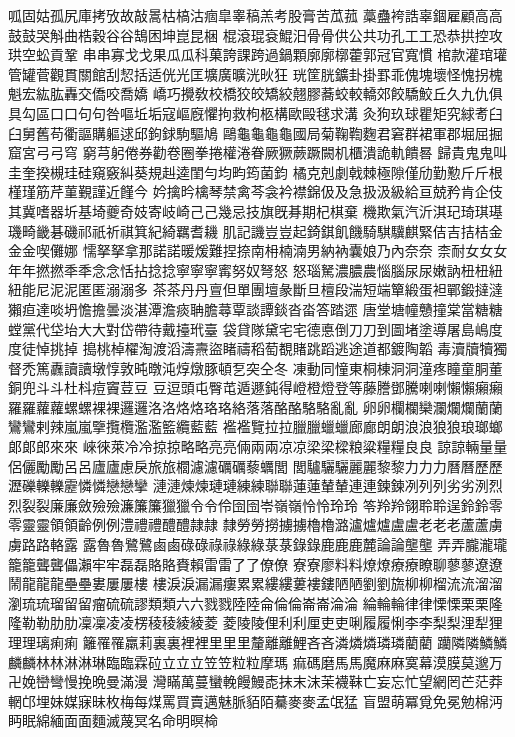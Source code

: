 呱固姑孤尻庫拷攷故敲暠枯槁沽痼皐睾稿羔考股膏苦苽菰
藁蠱袴誥辜錮雇顧⾼高⿎鼓哭斛曲梏穀⾕谷鵠困坤崑昆梱
棍滾琨袞鯤汨⾻骨供公共功孔⼯工恐恭拱控攻珙空蚣貢鞏
串串寡⼽戈果⽠瓜科菓誇課跨過鍋顆廓廓槨藿郭冠官寬慣
棺款灌琯瓘管罐菅觀貫關館刮恝括适侊光匡壙廣曠洸炚狂
珖筐胱鑛卦掛罫乖傀塊壞怪愧拐槐魁宏紘肱轟交僑咬喬嬌
嶠巧攪敎校橋狡皎矯絞翹膠蕎蛟較轎郊餃驕鮫丘久九仇俱
具勾區⼝口句句咎嘔坵垢寇嶇廐懼拘救枸柩構歐毆毬求溝
灸狗玖球瞿矩究絿耉⾅臼舅舊苟衢謳購軀逑邱鉤銶駒驅鳩
鷗⿔龜龜龜國局菊鞠鞫麴君窘群裙軍郡堀屈掘窟宮⼸弓穹
窮芎躬倦券勸卷圈拳捲權淃眷厥獗蕨蹶闕机櫃潰詭軌饋晷
歸貴⿁鬼叫圭奎揆槻珪硅窺竅糾葵規赳逵閨勻均畇筠菌鈞
橘克剋劇戟棘極隙僅劤勤懃⽄斤根槿瑾筋芹菫覲謹近饉今
妗擒昑檎琴禁禽芩衾衿襟錦伋及急扱汲級給亘兢矜肯企伎
其冀嗜器圻基埼夔奇妓寄岐崎⼰己幾忌技旗旣朞期杞棋棄
機欺氣汽沂淇玘琦琪璂璣畸畿碁磯祁祇祈祺箕紀綺羈耆耭
肌記譏豈豈起錡錤飢饑騎騏驥麒緊佶吉拮桔⾦金金喫儺娜
懦拏拏拿那諾諾暖煖難捏捺南枏楠湳男納衲囊娘乃內奈奈
柰耐⼥女女年年撚撚秊秊念念恬拈捻捻寧寧寧寗努奴弩怒
怒瑙駑濃膿農惱腦尿尿嫩訥杻杻紐紐能尼泥泥匿匿溺溺多
茶茶丹丹亶但單團壇彖斷旦檀段湍短端簞緞蛋袒鄲鍛撻澾
獺疸達啖坍憺擔曇淡湛潭澹痰聃膽蕁覃談譚錟沓畓答踏遝
唐堂塘幢戇撞棠當糖糖螳黨代垈坮⼤大對岱帶待戴擡玳臺
袋貸隊黛宅宅德悳倒⼑刀到圖堵塗導屠島嶋度度徒悼挑掉
搗桃棹櫂淘渡滔濤燾盜睹禱稻萄覩賭跳蹈逃途道都鍍陶韜
毒瀆牘犢獨督禿篤纛讀讀墩惇敦旽暾沌焞燉豚頓乭突仝冬
凍動同憧東桐棟洞洞潼疼瞳童胴董銅兜⽃斗杜枓痘竇荳⾖
豆逗頭屯臀芚遁遯鈍得嶝橙燈登等藤謄鄧騰喇喇懶懶癩癩
羅羅蘿蘿螺螺裸裸邏邏洛洛烙烙珞珞絡落落酪酪駱駱亂亂
卵卵欄欄欒瀾爛爛蘭蘭鸞鸞剌辣嵐嵐擥攬欖濫濫籃纜藍藍
襤襤覽拉拉臘臘蠟蠟廊廊朗朗浪浪狼狼琅瑯螂郞郞郎來來
崍徠萊冷冷掠掠略略亮亮倆兩兩凉凉梁梁樑粮粱糧糧良良
諒諒輛量量侶儷勵勵呂呂廬廬慮戾旅旅櫚濾濾礪礪藜蠣閭
閭驢驪驪麗麗黎黎⼒力力曆曆歷歷瀝礫轢轢靂憐憐戀戀攣
漣漣煉煉璉璉練練聯聯蓮蓮輦輦連連鍊鍊冽列列劣劣洌烈
烈裂裂廉廉斂殮殮濂簾簾獵獵令令伶囹囹岺嶺嶺怜怜玲玲
笭羚羚翎聆聆逞鈴鈴零零靈靈領領齡例例澧禮禮醴醴隷隷
隸勞勞撈擄擄櫓櫓潞瀘爐爐盧盧⽼老老蘆蘆虜虜路路輅露
露魯魯鷺鷺⿄鹵碌碌祿祿綠綠菉菉錄錄⿅鹿鹿麓論論壟壟
弄弄朧瀧瓏籠籠聾聾儡瀨牢牢磊磊賂賂賚賴雷雷了了僚僚
寮寮廖料料燎燎療療瞭聊蓼蓼遼遼鬧⿓龍龍壘壘婁屢屢樓
樓淚淚漏漏瘻累累縷縷蔞褸鏤陋陋劉劉旒柳柳榴流流溜溜
瀏琉琉瑠留留瘤硫硫謬類類六六戮戮陸陸侖倫倫崙崙淪淪
綸輪輪律律慄慄栗栗隆隆勒勒肋肋凜凜凌凌楞稜稜綾綾菱
菱陵陵俚利利厘吏吏唎履履悧李李梨梨浬犁狸理理璃痢痢
籬罹罹羸莉裏裏裡裡⾥里里釐離離鯉吝吝潾燐燐璘璘藺藺
躪隣隣鱗鱗麟麟林林淋淋琳臨臨霖砬⽴立立笠笠粒粒摩瑪
痲碼磨⾺馬魔⿇麻寞幕漠膜莫邈万卍娩巒彎慢挽晩曼滿漫
灣瞞萬蔓蠻輓饅鰻唜抹末沫茉襪靺亡妄忘忙望網罔芒茫莽
輞邙埋妹媒寐昧枚梅每煤罵買賣邁魅脈貊陌驀⿆麥孟氓猛
盲盟萌冪覓免冕勉棉沔眄眠綿緬⾯面麵滅蔑冥名命明暝椧
